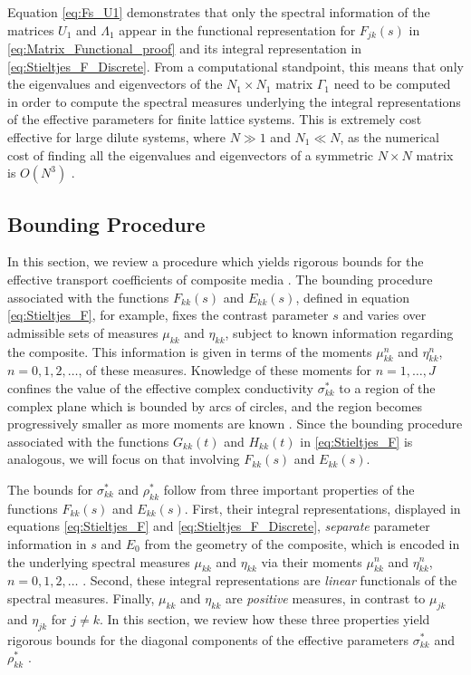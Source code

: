 \documentclass{cmslatex}
\begin{document}
Equation \eqref{eq:Fs_U1} demonstrates that only the spectral
information of the matrices $U_1$ and $\Lambda_1$ appear in the functional
representation for $F_{jk}(s)$ in
\eqref{eq:Matrix_Functional_proof} and its integral representation in
\eqref{eq:Stieltjes_F_Discrete}. From a computational standpoint, 
this means that only the eigenvalues and eigenvectors of the $N_1\times N_1$
matrix $\Gamma_1$ need to be computed in order to compute the spectral
measures underlying the integral representations of the effective
parameters for finite lattice systems. This is extremely cost
effective for large dilute systems, where $N\gg1$ and $N_1\ll N$, as the
numerical cost of finding all the eigenvalues and eigenvectors of a
symmetric $N\times N$ matrix is $O(N^3)$ \cite{Demmel:1997}.






\subsection{Bounding Procedure}\label{sec:Bounding_Procedure}
%
In this section, we review a procedure which yields rigorous bounds for
the effective transport coefficients of composite media
\cite{Golden:CMP-473,Golden:JMPS-333}. The bounding procedure
associated with the functions $F_{kk}(s)$ and $E_{kk}(s)$, 
defined in equation \eqref{eq:Stieltjes_F}, for example, fixes the
contrast parameter $s$ and varies over admissible sets of measures
$\mu_{kk}$ and $\eta_{kk}$, subject to
known information regarding the composite. This information is given
in terms of the moments $\mu_{kk}^n$ and $\eta_{kk}^n$, $n=0,1,2,\ldots$, of
these measures. Knowledge of these moments for $n=1,\ldots,J$ confines the
value of the effective complex conductivity $\sigma_{kk}^*$ to a region of
the complex plane which is bounded by arcs of circles, and the region
becomes progressively smaller as more moments are known
\cite{Milton:JAP-5294,Golden:JMPS-333}. Since the bounding procedure
associated with the functions $G_{kk}(t)$ and $H_{kk}(t)$ in
\eqref{eq:Stieltjes_F} is analogous, we will focus on that involving
$F_{kk}(s)$ and $E_{kk}(s)$.    


The bounds for $\sigma_{kk}^*$ and $\rho^*_{kk}$ follow from three important
properties of the functions $F_{kk}(s)$ and $E_{kk}(s)$. First, their
integral representations, displayed in equations
\eqref{eq:Stieltjes_F} and \eqref{eq:Stieltjes_F_Discrete},
\emph{separate} parameter information in $s$ and $E_0$ from the
geometry of the composite, which is encoded in the underlying spectral
measures $\mu_{kk}$ and $\eta_{kk}$ via their moments $\mu_{kk}^n$ and
$\eta_{kk}^n$, $n=0,1,2,\ldots$ \cite{Bruno:JSP-365,Golden:CMP-473}. Second,
these integral representations are \emph{linear} functionals of the
spectral measures. Finally, $\mu_{kk}$ and $\eta_{kk}$ are \emph{positive}
measures, in contrast to $\mu_{jk}$ and $\eta_{jk}$ for $j\neq k$. In this
section, we review how these three properties yield rigorous bounds
for the diagonal components of the effective parameters $\sigma^*_{kk}$ and
$\rho^*_{kk}$ \cite{Golden:CMP-473,Golden:JMPS-333}.
\end{document}
